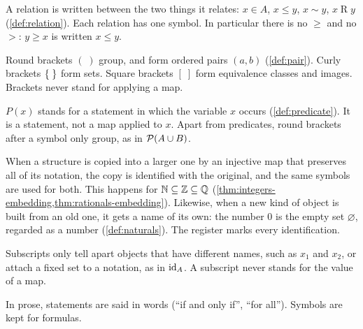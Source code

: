 \begin{notationrule}[Relations]
\label{rule:relations}
A relation is written between the two things it relates: $x \in A$, $x \le y$,
$x \sim y$, $x \mathrel{R} y$ (\cref{def:relation}). Each relation has one symbol.
In particular there is no $\ge$ and no $>$: $y \ge x$ is written $x \le y$.
\end{notationrule}

\begin{notationrule}[Brackets]
\label{rule:brackets}
Round brackets $(\;)$ group, and form ordered pairs $(a, b)$
(\cref{def:pair}). Curly brackets $\lbrace \; \rbrace$ form sets. Square brackets $[\;]$
form equivalence classes and images. Brackets never stand for applying a map.
\end{notationrule}

\begin{notationrule}[Predicates]
\label{rule:predicates}
$P(x)$ stands for a statement in which the variable $x$ occurs
(\cref{def:predicate}). It is a statement, not a map applied to $x$. Apart from
predicates, round brackets after a symbol only group, as in $\mathcal{P} (A \cup B)$.
\end{notationrule}

\begin{notationrule}[Identification]
\label{rule:identification}
When a structure is copied into a larger one by an injective map that preserves
all of its notation, the copy is identified with the original, and the same
symbols are used for both. This happens for $\mathbb{N} \subseteq \mathbb{Z} \subseteq \mathbb{Q}$
(\cref{thm:integers-embedding,thm:rationals-embedding}). Likewise, when a new
kind of object is built from an old one, it gets a name of its own: the number $0$
is the empty set $\varnothing$, regarded as a number (\cref{def:naturals}). The
register marks every identification.
\end{notationrule}

\begin{notationrule}[Subscripts]
\label{rule:subscripts}
Subscripts only tell apart objects that have different names, such as $x_1$ and
$x_2$, or attach a fixed set to a notation, as in $\mathrm{id}_A$. A subscript never
stands for the value of a map.
\end{notationrule}

\begin{notationrule}[Prose]
\label{rule:prose}
In prose, statements are said in words (\enquote{if and only if}, \enquote{for
all}). Symbols are kept for formulas.
\end{notationrule}
